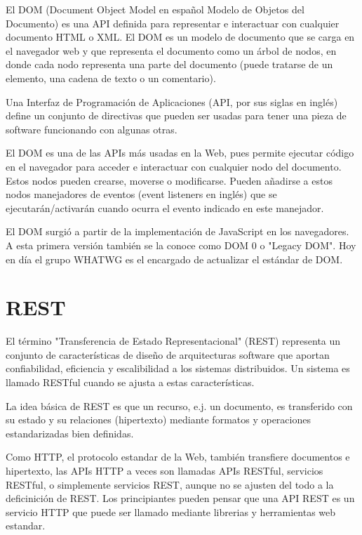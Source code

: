 El DOM (Document Object Model en español Modelo de Objetos del Documento) es una API definida para representar e interactuar con cualquier documento HTML o XML. El DOM es un modelo de documento que se carga en el navegador web y que representa el documento como un árbol de nodos, en donde cada nodo representa una parte del documento (puede tratarse de un elemento, una cadena de texto o un comentario).

\begin{remark}
Una Interfaz de Programación de Aplicaciones (API, por sus siglas en inglés) define un conjunto de directivas que pueden ser usadas para tener una pieza de software funcionando con algunas otras.
\end{remark}

El DOM es una de las APIs más usadas en la Web, pues permite ejecutar código en el navegador para acceder e interactuar con cualquier nodo del documento. Estos nodos pueden crearse, moverse o modificarse. Pueden añadirse a estos nodos manejadores de eventos (event listeners en inglés) que se ejecutarán/activarán cuando ocurra el evento indicado en este manejador.

El DOM surgió a partir de la implementación de JavaScript en los navegadores. A esta primera versión también se la conoce como DOM 0 o "Legacy DOM". Hoy en día el grupo WHATWG es el encargado de actualizar el estándar de DOM.


\section{REST}

El término "Transferencia de Estado Representacional" (REST) representa un conjunto de características de diseño de arquitecturas software que aportan confiabilidad, eficiencia y escalibilidad a los sistemas distribuidos. Un sistema es llamado RESTful cuando se ajusta a estas características.

La idea básica de REST es que un recurso, e.j. un documento, es transferido con su estado y su relaciones (hipertexto) mediante formatos y operaciones estandarizadas bien definidas.

Como HTTP, el protocolo estandar de la Web, también transfiere documentos e hipertexto, las APIs HTTP a veces son llamadas APIs RESTful, servicios RESTful, o simplemente servicios REST, aunque no se ajusten del todo a la deficinición de REST. Los principiantes pueden pensar que una API REST es un servicio HTTP que puede ser llamado mediante librerias y herramientas web estandar.


